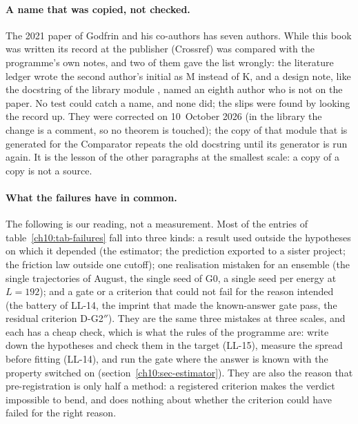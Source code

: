 \paragraph{A name that was copied, not checked.} The 2021 paper of Godfrin and his co-authors \cite{Godfrin2021} has seven authors. While this book was written its
record at the publisher (Crossref) was compared with the programme's own notes, and two of them gave the list wrongly: the literature ledger wrote the second
author's initial as M instead of K, and a design note, like the docstring of the library module , named an eighth author who is not on the paper.
No test could catch a name, and none did; the slips were found by looking the record up. They were corrected on 10~October 2026 (in the library the change is a
comment, so no theorem is touched); the copy of that module that is generated for the Comparator repeats the old docstring until its generator is run again.
It is the lesson of the other paragraphs at the smallest scale: a copy of a copy is not a source.

\paragraph{What the failures have in common.} The following is our reading, not a measurement. Most of the entries of table~\ref{ch10:tab-failures}
fall into three kinds: a result used outside the hypotheses on which it depended (the estimator; the prediction exported to a sister project; the
friction law outside one cutoff); one realisation mistaken for an ensemble (the single trajectories of August, the single seed of G0, a single seed
per energy at $L=192$); and a gate or a criterion that could not fail for the reason intended (the battery of LL-14, the imprint that made the
known-answer gate pass, the residual criterion D-G2$''$). They are the same three mistakes at three scales, and each has a cheap check, which is
what the rules of the programme are: write down the hypotheses and check them in the target (LL-15), measure the spread before fitting (LL-14),
and run the gate where the answer is known with the property switched on (section~\ref{ch10:sec-estimator}). They are also the reason that pre-registration
\cite{Nosek2018} is only half a method: a registered criterion makes the verdict impossible to bend, and does nothing about whether the criterion could
have failed for the right reason.

